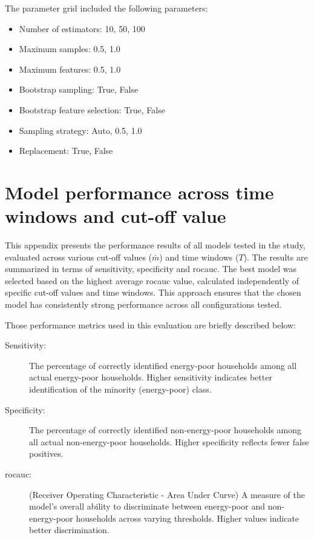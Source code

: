 \documentclass[preprint,authoryear,12pt]{elsarticle}
\begin{document}
The parameter grid included the following parameters:
\begin{itemize}
\item Number of estimators: 10, 50, 100
\item Maximum samples: 0.5, 1.0
\item Maximum features: 0.5, 1.0
\item Bootstrap sampling: True, False
\item Bootstrap feature selection: True, False
\item Sampling strategy: Auto, 0.5, 1.0
\item Replacement: True, False
\end{itemize}

\section{Model performance across time windows and cut-off value} \label{AppendixC}

This appendix presents the performance results of all models tested in the study, evaluated across various cut-off values ($\bar{m}$) and time windows ($T$). The results are summarized in terms of sensitivity, specificity and \Gls{rocauc}. The best model was selected based on the highest average \Gls{rocauc} value, calculated independently of specific cut-off values and time windows. This approach ensures that the chosen model has consistently  strong performance across all configurations tested.

Those performance metrics used in this evaluation are briefly described below:
\begin{description}
    \item[Sensitivity:] The percentage of correctly identified energy-poor households among all actual energy-poor households. Higher sensitivity indicates better identification of the minority (energy-poor) class. 
    \item[Specificity:] The percentage of correctly identified non-energy-poor households among all actual non-energy-poor households. Higher specificity reflects fewer false positives.
    \item[\Gls{rocauc}:] (Receiver Operating Characteristic - Area Under Curve) A measure of the model’s overall ability to discriminate between energy-poor and non-energy-poor households across varying thresholds. Higher values indicate better discrimination.
\end{description}
\end{document}

